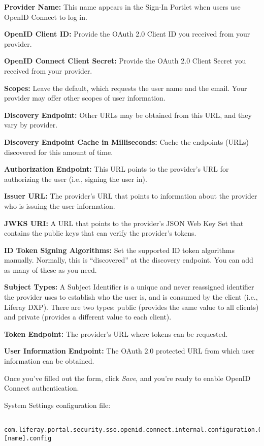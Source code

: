 \textbf{Provider Name:} This name appears in the Sign-In Portlet when
users use OpenID Connect to log in.

\textbf{OpenID Client ID:} Provide the OAuth 2.0 Client ID you received
from your provider.

\textbf{OpenID Connect Client Secret:} Provide the OAuth 2.0 Client
Secret you received from your provider.

\textbf{Scopes:} Leave the default, which requests the user name and the
email. Your provider may offer other scopes of user information.

\textbf{Discovery Endpoint:} Other URLs may be obtained from this URL,
and they vary by provider.

\textbf{Discovery Endpoint Cache in Milliseconds:} Cache the endpoints
(URLs) discovered for this amount of time.

\textbf{Authorization Endpoint:} This URL points to the provider's URL
for authorizing the user (i.e., signing the user in).

\textbf{Issuer URL:} The provider's URL that points to information about
the provider who is issuing the user information.

\textbf{JWKS URI:} A URL that points to the provider's JSON Web Key Set
that contains the public keys that can verify the provider's tokens.

\textbf{ID Token Signing Algorithms:} Set the supported ID token
algorithms manually. Normally, this is ``discovered'' at the discovery
endpoint. You can add as many of these as you need.

\textbf{Subject Types:} A Subject Identifier is a unique and never
reassigned identifier the provider uses to establish who the user is,
and is consumed by the client (i.e., Liferay DXP). There are two types:
public (provides the same value to all clients) and private (provides a
different value to each client).

\textbf{Token Endpoint:} The provider's URL where tokens can be
requested.

\textbf{User Information Endpoint:} The OAuth 2.0 protected URL from
which user information can be obtained.

Once you've filled out the form, click \emph{Save}, and you're ready to
enable OpenID Connect authentication.

\noindent\hrulefill

System Settings configuration file:

\begin{verbatim}
 com.liferay.portal.security.sso.openid.connect.internal.configuration.OpenIdConnectProviderConfiguration-[name].config
\end{verbatim}

